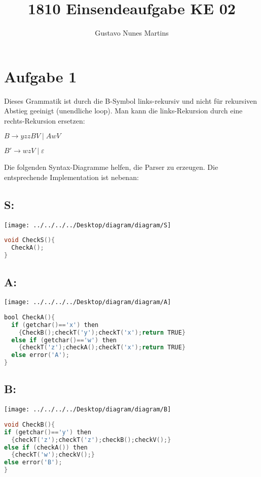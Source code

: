 \documentclass[11pt]{scrartcl}
\title{\textbf{1810 Einsendeaufgabe KE 02}}
\author{Gustavo Nunes Martins}
\begin{document}
	\maketitle
	\section*{Aufgabe 1}
	Dieses Grammatik ist durch die B-Symbol links-rekursiv und nicht für rekursiven Abstieg geeinigt (unendliche loop). Man kann die links-Rekursion durch eine rechts-Rekursion ersetzen:
	
	\begin{center}
	$B \rightarrow yzzBV \mid AwV$
	
	$B' \rightarrow wzV \mid \varepsilon$
	\end{center}
	Die folgenden Syntax-Diagramme helfen, die Parser zu erzeugen. Die entsprechende Implementation ist nebenan:
	\subsection*{S:}
	\begin{minipage}{.5\textwidth}
	\texttt{[image: ../../../../Desktop/diagram/diagram/S]}
	\end{minipage}
	\begin{minipage}{0.6\textwidth}
		\begin{lstlisting}[language=C]		
void CheckS(){
  CheckA();
}
		\end{lstlisting}
	\end{minipage}
	\subsection*{A:}
	\begin{minipage}{0.5\textwidth}
		\texttt{[image: ../../../../Desktop/diagram/diagram/A]}
	\end{minipage}
	\begin{minipage}{0.6\textwidth}
		\begin{lstlisting}[language=C]		
bool CheckA(){
  if (getchar()=='x') then 
    {CheckB();checkT('y');checkT('x');return TRUE}
  else if (getchar()=='w') then 
    {checkT('z');checkA();checkT('x');return TRUE}
  else error('A');
}
		\end{lstlisting}
	\end{minipage}	
	\subsection*{B:}
	\begin{minipage}{0.5\textwidth}
		\texttt{[image: ../../../../Desktop/diagram/diagram/B]}
	\end{minipage}
	\begin{minipage}{0.6\textwidth}
		\begin{lstlisting}[language=C]		
void CheckB(){
if (getchar()=='y') then 
  {checkT('z');checkT('z');checkB();checkV();}
else if (checkA()) then 
  {checkT('w');checkV();}
else error('B');
}
\end{lstlisting}
	\end{minipage}
\end{document}
